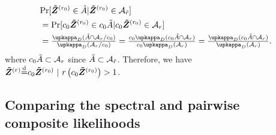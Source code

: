 \documentclass[12pt]{article}
\begin{document}
    \begin{align*}
        & \Pr[\bm{\tilde Z}^{(r_0)}\in \tilde A | \bm{\tilde Z}^{(r_0)} \in \calA_{\tilde r} ] \\
        &= \Pr[c_0\bm{\tilde Z}^{(r_0)}\in c_0\tilde A | c_0\bm{\tilde Z}^{(r_0)} \in \calA_{r} ] \\
        &= \frac{\upkappa_D(\tilde A \cap \calA_r/c_0)}{\upkappa_D(\calA_{r}/c_0)} = \frac{c_0\upkappa_D(c_0\tilde A \cap \calA_r)}{c_0\upkappa_D(\calA_{r})} = \frac{\upkappa_D(c_0\tilde A \cap \calA_r)}{\upkappa_D(\calA_{r})}. 
    \end{align*}
    where $c_0\tilde A\subset {\mathcal A}_{r}$ since $\tilde A\subset {\mathcal A}_{\tilde r}$. Therefore, we have $\bm{\tilde Z}^{(r)}{\stackrel{\mathrm{d}}{=}} c_0\bm{\tilde Z}^{(r_0)}\ | \ r\left(c_0\bm{\tilde Z}^{(r_0)}\right) > 1 $.


\subsection{Comparing the spectral and pairwise composite likelihoods}
\end{document}
